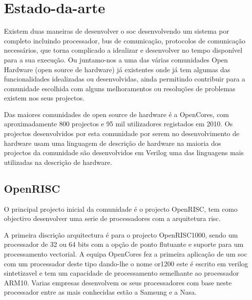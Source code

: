 \chapter{Estado-da-arte}
\label{chapter:estadodaarte}

Existem duas maneiras de desenvolver o \acrshort{soc} desenvolvendo um sistema por completo incluindo processador, bus de comunicação, protocolos de comunicação necessários, que torna complicado a idealizar e desenvolver no tempo disponível para a sua execução. Ou juntamo-nos a uma das várias comunidades Open Hardware (open source de hardware) já existentes onde já tem algumas das funcionalidades idealizadas ou desenvolvidas, ainda permitindo contribuir para a comunidade escolhida com alguns melhoramentos ou resoluções de problemas existem nos seus projectos.

Das maiores comunidades de open source de hardware é a OpenCores, com aproximadamente 800 projectos e 95 mil utilizadores registados em 2010. Os projectos desenvolvidos por esta comunidade por serem no desenvolvimento de hardware usam uma linguagem de descrição de hardware na maioria dos projectos da comunidade são desenvolvidos em Verilog uma das linguagens mais utilizadas na descrição de hardware.

\section{OpenRISC}
\label{section:OpenRisc}


O principal projecto inicial da comunidade é o projecto OpenRISC, tem como objectivo desenvolver uma serie de processadores com a arquitetura \acrlong{risc}.

 A primeira discrição arquitectura é para o projecto OpenRISC1000, sendo um processador de 32 ou 64 bits com a opção de ponto flutuante e suporte para um processamento vectorial. A equipa OpenCores fez a primeira aplicação de um \acrshort{soc} com um processador deste tipo dando-lhe o nome \acrlong{or1200} este é escrito em verilog sintetizavel e tem um capacidade de processamento semelhante ao processador ARM10. Varias empresas desenvolvem os seus processadores com base neste processador entre as mais conhecidas estão a Samsung e a Nasa. 

